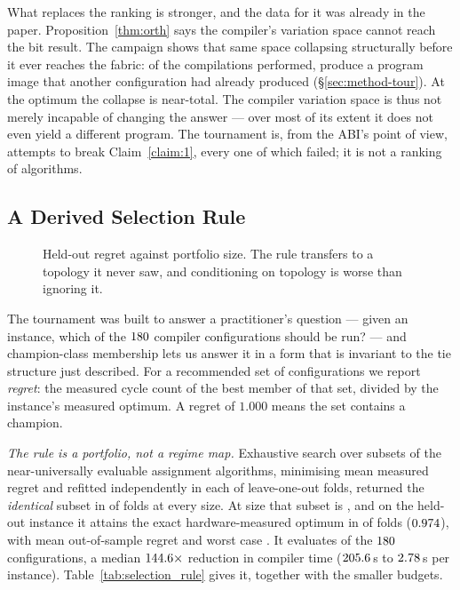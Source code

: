 \documentclass[journal,10pt]{IEEEtran}
\theoremstyle{plain}
\theoremstyle{definition}
\theoremstyle{remark}
\begin{document}
What replaces the ranking is stronger, and the data for it was already in the
paper. Proposition~\ref{thm:orth} says the compiler's variation space cannot
reach the bit result. The campaign shows that same space collapsing
structurally before it ever reaches the fabric: of the \ClsCompilations{}
compilations performed, \ClsCollapse{} produce a program image that another
configuration had already produced (\S\ref{sec:method-tour}). At the optimum the collapse is
near-total. The compiler variation space is thus not merely incapable of
changing the answer --- over most of its extent it does not even yield a
different program. The tournament is, from the ABI's point of view,
\WallTBs{} attempts to break Claim~\ref{claim:1}, every one of which failed;
it is not a ranking of algorithms.

\subsection{A Derived Selection Rule}\label{sec:selrule}

\begin{figure}[!t]\centering

\caption{Held-out regret against portfolio size. The rule transfers to a topology it never saw, and conditioning on topology is worse than ignoring it.}\label{fig:selection}
\end{figure}


The tournament was built to answer a practitioner's question --- given an
instance, which of the $180$ compiler configurations should be
run? --- and champion-class membership lets us answer it in a form that is
invariant to the tie structure just described. For a recommended set of
configurations we report \emph{regret}: the measured cycle count of the best
member of that set, divided by the instance's measured optimum. A regret of
$1.000$ means the set contains a champion.

\emph{The rule is a portfolio, not a regime map.} Exhaustive search over
subsets of the \SelSearchAlgs{} near-universally evaluable assignment
algorithms, minimising mean measured regret and refitted independently in
each of \SelFolds{} leave-one-out folds, returned the \emph{identical} subset
in \SelFolds{} of \SelFolds{} folds at every size. At size \SelKFour{} that
subset is \SelPortfolio{}, and on the held-out instance it attains the exact
hardware-measured optimum in \SelKFourOpt{} of \TournNInst{} folds
($0.974$), with mean out-of-sample regret \SelKFourMean{} and worst
case \SelKFourWorst{}. It evaluates \SelConfigsRun{} of the
$180$ configurations, a median $144.6\times$ reduction in
compiler time ($205.6$\,s to $2.78$\,s per instance).
Table~\ref{tab:selection_rule} gives it, together with the smaller budgets.
\end{document}
